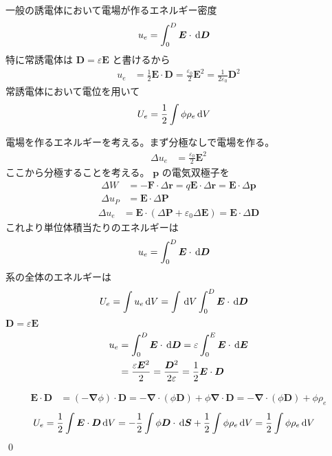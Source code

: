 \documentclass[uplatex,dvipdfmx,a4paper,11pt]{jlreq}
\makeatletter
\newcommand{\EE}{\bm{E}}
\newcommand{\DD}{\bm{D}}
\newcommand{\PP}{\bm{P}}
\newcommand{\rr}{\bm{r}}
\newcommand{\pp}{\bm{p}}
\renewcommand{\SS}{\bm{S}}
\newcommand{\vnabla}{\mathbf{\nabla}}
\numberwithin{equation}{section}
\theoremstyle{definition}
\renewenvironment{proof}[1][\proofname]{\par
  \normalfont
  \topsep6\p@\@plus6\p@ \trivlist
  \item[\hskip\labelsep{\bfseries #1}\@addpunct{\bfseries}]\ignorespaces\quad\par
}{%
  \qed\endtrivlist\@endpefalse
}
\renewcommand\proofname{証明}
\makeatother
\begin{document}
\begin{theorem}[誘電体のエネルギー]
  一般の誘電体において電場が作るエネルギー密度
  \begin{align}
    u_e & = \int_0^D\EE\cdot\dl{\DD}
  \end{align}
  特に常誘電体は $\DD = \varepsilon\EE$ と書けるから
  \begin{align}
    u_e & = \frac{1}{2}\EE\cdot\DD = \frac{\varepsilon_0}{2}\EE^2 = \frac{1}{2\varepsilon_0}\DD^2
  \end{align}
  常誘電体において電位を用いて
  \begin{align}
    U_e & = \frac{1}{2}\int\phi\rho_e\dl{V}
  \end{align}
\end{theorem}
\begin{proof}
  電場を作るエネルギーを考える。まず分極なしで電場を作る。
  \begin{align}
    \Delta u_e & = \frac{\varepsilon_0}{2}\EE^2
  \end{align}
  ここから分極することを考える。 $\pp$ の電気双極子を
  \begin{align}
    \Delta W   & = -\bm{F}\cdot\Delta\rr = q\EE\cdot\Delta\rr = \EE\cdot\Delta\pp \\
    \Delta u_P & = \EE\cdot\Delta\PP
  \end{align}
  \begin{align}
    \Delta u_e & = \EE\cdot(\Delta\PP + \varepsilon_0\Delta\EE) = \EE\cdot\Delta\DD
  \end{align}
  これより単位体積当たりのエネルギーは
  \begin{align}
    u_e & = \int_0^D\EE\cdot\dl{\DD}
  \end{align}
  系の全体のエネルギーは
  \begin{align}
    U_e & = \int u_e\dl{V} = \int\dl{V}\int_0^D\EE\cdot\dl{\DD}
  \end{align}
  $\DD = \varepsilon\EE$
  \begin{align}
    u_e & = \int_0^D\EE\cdot\dl{\DD} = \varepsilon\int_0^E\EE\cdot\dl{\EE}                   \\
        & = \frac{\varepsilon\EE^2}{2} = \frac{\DD^2}{2\varepsilon} = \frac{1}{2}\EE\cdot\DD
  \end{align}

  \begin{align}
    \EE\cdot\DD & = (-\vnabla\phi)\cdot\DD = -\vnabla\cdot(\phi\DD) + \phi\vnabla\cdot\DD = -\vnabla\cdot(\phi\DD) + \phi\rho_e
  \end{align}
  \begin{align}
    U_e & = \frac{1}{2}\int\EE\cdot\DD\dl{V} = -\frac{1}{2}\int\phi\DD\cdot\dl{\SS} + \frac{1}{2}\int\phi\rho_e\dl{V} = \frac{1}{2}\int\phi\rho_e\dl{V}
  \end{align}
\end{proof}
\end{document}

